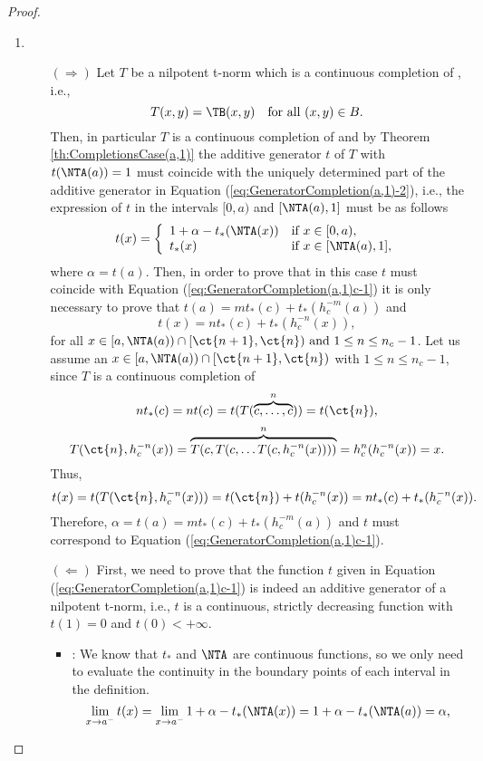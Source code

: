 \begin{proof}
	\begin{enumerate}[label=(\roman*)]
		\item ~~
		\begin{itemize}
			\item[$(\Rightarrow)$] Let $T$ be a nilpotent t-norm which is a continuous completion of \TB, i.e.,
			$$T(x,y)=\TB(x,y) \quad \text{for all } (x,y) \in B.$$
			Then, in particular $T$ is a continuous completion of \TA and by Theorem \ref{th:CompletionsCase(a,1)} the additive generator $t$ of $T$ with $t(\NTA(a))=1$ must coincide with the uniquely determined part of the additive generator in Equation (\ref{eq:GeneratorCompletion(a,1)-2}), i.e., the expression of $t$ in the intervals $[0,a)$ and $[\NTA(a),1]$ must be as follows
			$$
			t(x)
			=
			\left\{ \begin{array}{ll}
				1+\alpha-t_{*}(\NTA(x)) & \text{if } x \in [0,a), \\
				t_{*}(x) & \text{if } x \in [\NTA(a),1],
			\end{array} \right.
			$$
			where $\alpha=t(a)$. Then, in order to prove that in this case $t$ must coincide with Equation (\ref{eq:GeneratorCompletion(a,1)c-1}) it is only necessary to prove that $t(a)=mt_*(c)+t_*(h_c^{-m}(a))$ and
			$$t(x)=nt_*(c)+t_*(h_c^{-n}(x)),$$
			for all $x \in [a,\NTA(a)) \cap [\ct{n+1},\ct{n}) \text{ and } 1 \leq n \leq n_c-1$. Let us assume an $x \in [a,\NTA(a)) \cap [\ct{n+1},\ct{n})$ with  $1 \leq n \leq n_c-1$, since $T$ is a continuous completion of \TB
			$$nt_*(c)=nt(c)= t(T(\overbrace{c,\dots,c}^{n})) = t(\ct{n}),$$
			$$T(\ct{n},h_c^{-n}(x))=\overbrace{T(c,T(c,\dots T(c,h_c^{-n}(x))))}^n=h_c^{n}(h_c^{-n}(x))=x.$$
			Thus,
			$$t(x)=t(T(\ct{n},h_c^{-n}(x))) = t(\ct{n})+t(h_c^{-n}(x)) = nt_*(c)+t_*(h_c^{-n}(x)).$$
			Therefore, $\alpha=t(a)=mt_*(c)+t_*(h_c^{-m}(a))$ and $t$ must correspond to Equation  (\ref{eq:GeneratorCompletion(a,1)c-1}).
			\item[$(\Leftarrow)$] First, we need to prove that the function $t$ given in Equation (\ref{eq:GeneratorCompletion(a,1)c-1}) is indeed an additive generator of a nilpotent t-norm, i.e., $t$ is a continuous, strictly decreasing function with $t(1)=0$ and $t(0)<+\infty$.
			\begin{itemize}
				\item \underline{}: We know that $t_*$ and $\NTA$ are continuous functions, so we only need to evaluate the continuity in the boundary points of each interval in the definition.
				$$
				\lim_{x \to a^-} t(x) = \lim_{x \to a^-} 1 + \alpha -t_*(\NTA(x)) = 1+\alpha-t_*(\NTA(a)) = \alpha,
$$
\end{itemize}
\end{itemize}
\end{enumerate}
\end{proof}
